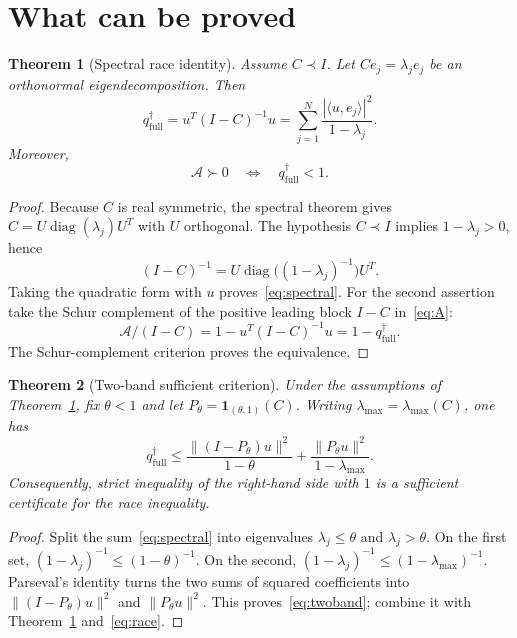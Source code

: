 \documentclass[11pt]{article}
\newtheorem{theorem}{Theorem}
\theoremstyle{remark}
\newcommand{\ip}[2]{\langle #1,#2\rangle}
\newcommand{\qfull}{q^{\dagger}_{\mathrm{full}}}
\begin{document}
\section{What can be proved}

\begin{theorem}[Spectral race identity]\label{thm:spectral}
Assume $C\prec I$.  Let
$Ce_j=\lambda_j e_j$ be an orthonormal eigendecomposition.
Then
\begin{equation}\label{eq:spectral}
 \qfull
 =u^T(I-C)^{-1}u
 =\sum_{j=1}^{N}
   \frac{|\ip{u}{e_j}|^2}{1-\lambda_j}.
\end{equation}
Moreover,
\[
 \mathcal A\succ0
 \quad\Longleftrightarrow\quad
 \qfull<1 .
\]
\end{theorem}

\begin{proof}
Because $C$ is real symmetric, the spectral theorem gives
$C=U\operatorname{diag}(\lambda_j)U^T$ with $U$ orthogonal.
The hypothesis $C\prec I$ implies $1-\lambda_j>0$, hence
\[
 (I-C)^{-1}
 =U\operatorname{diag}\bigl((1-\lambda_j)^{-1}\bigr)U^T.
\]
Taking the quadratic form with $u$ proves~\eqref{eq:spectral}.
For the second assertion take the Schur complement of the positive
leading block $I-C$ in~\eqref{eq:A}:
\[
 \mathcal A/(I-C)
 =1-u^T(I-C)^{-1}u=1-\qfull .
\]
The Schur-complement criterion proves the equivalence.
\end{proof}

\begin{theorem}[Two-band sufficient criterion]\label{thm:twoband}
Under the assumptions of Theorem~\ref{thm:spectral}, fix
$\theta<1$ and let
$P_\theta=\mathbf 1_{(\theta,1)}(C)$.
Writing $\lambda_{\max}=\lambda_{\max}(C)$, one has
\begin{equation}\label{eq:twoband}
\qfull\le
\frac{\|(I-P_\theta)u\|^2}{1-\theta}
+\frac{\|P_\theta u\|^2}{1-\lambda_{\max}}.
\end{equation}
Consequently, strict inequality of the right-hand side with $1$
is a sufficient certificate for the race inequality.
\end{theorem}

\begin{proof}
Split the sum~\eqref{eq:spectral} into eigenvalues
$\lambda_j\le\theta$ and $\lambda_j>\theta$.
On the first set,
$(1-\lambda_j)^{-1}\le(1-\theta)^{-1}$.
On the second,
$(1-\lambda_j)^{-1}\le(1-\lambda_{\max})^{-1}$.
Parseval's identity turns the two sums of squared coefficients into
$\|(I-P_\theta)u\|^2$ and $\|P_\theta u\|^2$.
This proves~\eqref{eq:twoband}; combine it with
Theorem~\ref{thm:spectral} and~\eqref{eq:race}.
\end{proof}
\end{document}
